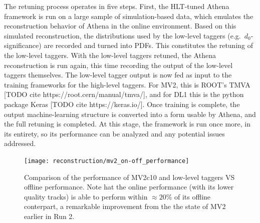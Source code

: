         The retuning process operates in five steps.
        First, the HLT-tuned Athena framework is run on a large sample of simulation-based data,
            which emulates the reconstruction behavior of Athena in the online environment.
        Based on this simulated reconstruction, the distributions used by the low-level taggers
            (e.g.\ $d_0$-significance) are recorded and turned into PDFs.
        This constitutes the retuning of the low-level taggers.
        With the low-level taggers retuned, the Athena reconstruction is run again,
            this time recording the output of the low-level taggers themselves.
        The low-level tagger output is now fed as input to the training frameworks for the high-level taggers.
        For MV2, this is ROOT's TMVA [TODO cite https://root.cern/manual/tmva/],
            and for DL1 this is the python package Keras [TODO cite https://keras.io/].
        Once training is complete, the output machine-learning structure is converted into a form usable by Athena,
            and the full retuning is completed.
        At this stage, the framework is run once more, in its entirety,
            so its performance can be analyzed and any potential issues addressed.

        \begin{figure}[tbh]
            \texttt{[image: reconstruction/mv2\_on-off\_performance]}
            \caption{
                Comparison of the performance of MV2c10 and low-level taggers VS offline performance\cite{Gupta:2271945}.
                Note hat the online performance (with its lower quality tracks) is able to perform within $\approx 20\%$
                    of its offline conterpart, a remarkable improvement from the the state of MV2 earlier in Run 2.
            }
            \label{fig:mv2_performance}
        \end{figure}


